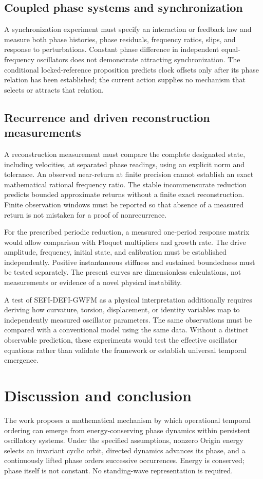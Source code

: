 \documentclass[aip,adv,preprint,floatfix]{revtex4-2}
\begin{document}
\subsection*{Coupled phase systems and synchronization}
A synchronization experiment must specify an interaction or feedback law and measure both phase histories, phase residuals, frequency ratios, slips, and response to perturbations. Constant phase difference in independent equal-frequency oscillators does not demonstrate attracting synchronization. The conditional locked-reference proposition predicts clock offsets only after its phase relation has been established; the current action supplies no mechanism that selects or attracts that relation.

\subsection*{Recurrence and driven reconstruction measurements}
A reconstruction measurement must compare the complete designated state, including velocities, at separated phase readings, using an explicit norm and tolerance. An observed near-return at finite precision cannot establish an exact mathematical rational frequency ratio. The stable incommensurate reduction predicts bounded approximate returns without a finite exact reconstruction. Finite observation windows must be reported so that absence of a measured return is not mistaken for a proof of nonrecurrence.

For the prescribed periodic reduction, a measured one-period response matrix would allow comparison with Floquet multipliers and growth rate. The drive amplitude, frequency, initial state, and calibration must be established independently. Positive instantaneous stiffness and sustained boundedness must be tested separately. The present curves are dimensionless calculations, not measurements or evidence of a novel physical instability.

A test of SEFI-DEFI-GWFM as a physical interpretation additionally requires deriving how curvature, torsion, displacement, or identity variables map to independently measured oscillator parameters. The same observations must be compared with a conventional model using the same data. Without a distinct observable prediction, these experiments would test the effective oscillator equations rather than validate the framework or establish universal temporal emergence.

\section{Discussion and conclusion}
The work proposes a mathematical mechanism by which operational temporal ordering can emerge from energy-conserving phase dynamics within persistent oscillatory systems. Under the specified assumptions, nonzero Origin energy selects an invariant cyclic orbit, directed dynamics advances its phase, and a continuously lifted phase orders successive occurrences. Energy is conserved; phase itself is not constant. No standing-wave representation is required.
\end{document}
